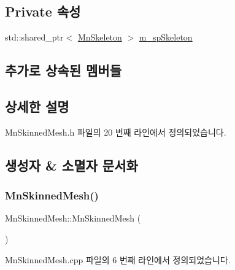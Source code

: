 \subsection*{Private 속성}
\begin{DoxyCompactItemize}
\item 
std\+::shared\+\_\+ptr$<$ \hyperlink{class_m_n_l_1_1_mn_skeleton}{Mn\+Skeleton} $>$ \hyperlink{class_m_n_l_1_1_mn_skinned_mesh_a38fb5a56e78aafdb535dfd3115857527}{m\+\_\+sp\+Skeleton}
\end{DoxyCompactItemize}
\subsection*{추가로 상속된 멤버들}


\subsection{상세한 설명}


Mn\+Skinned\+Mesh.\+h 파일의 20 번째 라인에서 정의되었습니다.



\subsection{생성자 \& 소멸자 문서화}
\mbox{\label{class_m_n_l_1_1_mn_skinned_mesh_a4fa48c8717084c6b531904b03218a53a}} 
\subsubsection{\texorpdfstring{Mn\+Skinned\+Mesh()}{MnSkinnedMesh()}}
{\footnotesize\ttfamily Mn\+Skinned\+Mesh\+::\+Mn\+Skinned\+Mesh (\begin{DoxyParamCaption}{ }\end{DoxyParamCaption})}



Mn\+Skinned\+Mesh.\+cpp 파일의 6 번째 라인에서 정의되었습니다.

\mbox{\label{class_m_n_l_1_1_mn_skinned_mesh_a02d5a7d9417239ca70275166acba5756}} 
